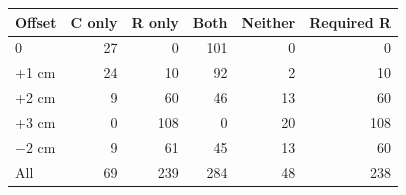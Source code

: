 \begin{tabular}{lrrrrr}\toprule
Offset & C only & R only & Both & Neither & Required R\\\midrule
0 & 27 & 0 & 101 & 0 & 0\\
+1 cm & 24 & 10 & 92 & 2 & 10\\
+2 cm & 9 & 60 & 46 & 13 & 60\\
+3 cm & 0 & 108 & 0 & 20 & 108\\
$-2$ cm & 9 & 61 & 45 & 13 & 60\\
All & 69 & 239 & 284 & 48 & 238\\\bottomrule\end{tabular}
